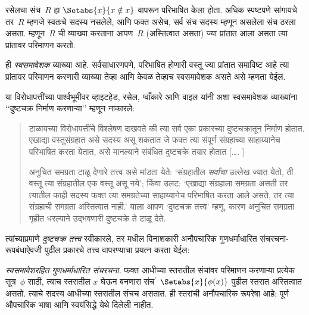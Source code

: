 \documentclass[../../../include/open-logic-section]{subfiles}
\begin{document}


रसेलचा संच~$R$ हा
$\Setabs{x}{x \notin
x}$ वापरून परिभाषित
केला होता. अधिक
स्पष्टपणे सांगायचे
तर~$R$ म्हणजे
स्वतःचे सदस्य
नसलेले, आणि
फक्त असेच,
सर्व संच सदस्य
म्हणून असलेला
संच ठरला असता.
म्हणून~$R$ ची
व्याख्या करताना
आपण~$R$
(अस्तित्वात असता)
ज्या प्रांतात
आला असता
त्या प्रांतावर
परिमाणन करतो.

ही \emph{स्वसमावेशक}
व्याख्या आहे.
सर्वसाधारणपणे,
परिभाषित होणारी
वस्तू ज्या
प्रांतात समाविष्ट
आहे त्या
प्रांतावर
परिमाणन करणारी
व्याख्या तेव्हा
आणि केवळ तेव्हाच
स्वसमावेशक
असते असे
म्हणता येईल.

या विरोधापत्तींच्या
पार्श्वभूमीवर
व्हाइटहेड, रसेल,
प्वाँकारे आणि
वाइल यांनी
अशा स्वसमावेशक
व्याख्यांना
‘‘दुष्टचक्र निर्माण
करणाऱ्या’’ म्हणून
नाकारले:
\begin{quote}
  टाळायच्या
  विरोधापत्तींचे
  विश्लेषण
  दाखवते की
  त्या सर्व
  एका प्रकारच्या
  दुष्टचक्रातून
  निर्माण होतात.
  एखाद्या
  वस्तुसंग्रहात
  असे सदस्य
  असू शकतात
  जे फक्त
  त्या संपूर्ण
  संग्रहाच्या
  साहाय्यानेच
  परिभाषित
  करता येतात,
  असे मानल्याने
  संबंधित दुष्टचक्रे
  तयार होतात
  [\ldots. \textparagraph]

  अनुचित समग्रता
  टाळू देणारे
  तत्त्व असे
  मांडता येते:
  ‘संग्रहातील
  \emph{सर्वांचा}
  उल्लेख ज्यात
  येतो, ती
  वस्तू त्या
  संग्रहातील
  एक वस्तू
  असू नये’;
  किंवा उलट:
  ‘एखाद्या
  संग्रहाला
  समग्रता असती
  तर त्यातील
  काही सदस्य
  फक्त त्या
  समग्रतेच्या
  साहाय्यानेच
  परिभाषित
  करता आले
  असते, तर
  त्या संग्रहाची
  समग्रता
  अस्तित्वात
  नाही.’ याला
  आपण
  ‘दुष्टचक्र
  तत्त्व’
  म्हणू,
  कारण
  अनुचित
  समग्रता
  गृहीत
  धरल्याने
  उद्भवणारी
  दुष्टचक्रे
  ते टाळू
  देते.
  \citep[p.~37]{WhiteheadRussell1910}
\end{quote}
त्यांच्याप्रमाणे
\emph{दुष्टचक्र तत्त्व}
स्वीकारले, तर
मधील विनाशकारी
अनौपचारिक
गुणधर्माधारित
संचरचना-रूपबंधाऐवजी
पुढील प्रकारचे
तत्त्व वापरण्याचा
प्रयत्न करता
येईल:

\begin{defish}
\emph{स्वसमावेशरहित
गुणधर्माधारित
संचरचना.}
फक्त आधीच्या स्तरातील संचांवर परिमाणन करणाऱ्या
प्रत्येक सूत्र~$\phi$ साठी, त्याच स्तरातील $x$ घेऊन बनणारा
संच$^\prime$ $\Setabs{x}{\phi(x)}$ पुढील स्तरात अस्तित्वात असतो.
त्याचे सदस्य आधीच्या स्तरातील संचच असतात.
ही स्तरांची अनौपचारिक रूपरेषा आहे;
पूर्ण औपचारिक भाषा आणि स्वयंसिद्धे येथे दिलेली नाहीत.
\end{defish}
\end{document}
